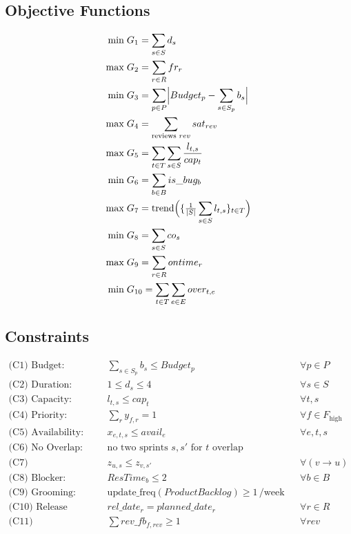 \documentclass{article}
\begin{document}
\subsection*{Objective Functions}
\begin{align*}
\min &\; G_1 = \sum_{s\in S} d_s \\
\max &\; G_2 = \sum_{r\in R} fr_r \\
\min &\; G_3 = \sum_{p\in P} \Bigl| Budget_p - \sum_{s\in S_p} b_s \Bigr| \\
\max &\; G_4 = \sum_{\text{reviews } rev} sat_{rev} \\
\max &\; G_5 = \sum_{t\in T}\sum_{s\in S} \frac{l_{t,s}}{cap_t} \\
\min &\; G_6 = \sum_{b\in B} is\_bug_b \\
\max &\; G_7 = \text{trend}\Bigl(\{\tfrac{1}{|S|}\sum_{s\in S} l_{t,s}\}_{t\in T}\Bigr) \\
\min &\; G_8 = \sum_{s\in S} co_s \\
\max &\; G_9 = \sum_{r\in R} ontime_r \\
\min &\; G_{10} = \sum_{t\in T}\sum_{e\in E} over_{t,e}
\end{align*}

\subsection*{Constraints}
\begin{align}
\text{(C1) Budget:} &\quad \sum_{s\in S_p} b_s \le Budget_p &&\forall p\in P \\
\text{(C2) Duration:} &\quad 1 \le d_s \le 4 &&\forall s\in S \\
\text{(C3) Capacity:} &\quad l_{t,s} \le cap_t &&\forall t,s \\
\text{(C4) Priority:} &\quad \sum_{r} y_{f,r} = 1 &&\forall f\in F_{\text{high}} \\
\text{(C5) Availability:} &\quad x_{e,t,s} \le avail_e &&\forall e,t,s \\
\text{(C6) No Overlap:} &\quad \text{no two sprints } s,s' \text{ for } t \text{ overlap} \\
\text{(C7) Dependencies:} &\quad z_{u,s} \le z_{v,s'} &&\forall (v \to u) \\
\text{(C8) Blocker:} &\quad ResTime_b \le 2 &&\forall b\in B \\
\text{(C9) Grooming:} &\quad \text{update\_freq}(ProductBacklog) \ge 1\,/\text{week} \\
\text{(C10) Release Date:} &\quad rel\_date_r = planned\_date_r &&\forall r\in R \\
\text{(C11) Engagement:} &\quad \sum rev\_fb_{f,rev} \ge 1 &&\forall rev
\end{align}
\end{document}
